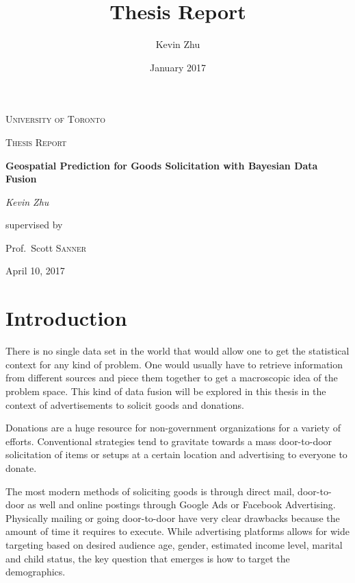 \documentclass[12pt]{article}
\title{Thesis Report}
\date{January 2017}
\author{Kevin Zhu}
\begin{document}
\begin{titlepage}
   \centering
   {\scshape\LARGE University of Toronto \par}
   \vspace{1cm}
   {\scshape\Large Thesis Report\par}
   \vspace{1.5cm}
   {\huge\bfseries Geospatial Prediction for Goods Solicitation with Bayesian Data Fusion\par}
   \vspace{2cm}
   {\Large\itshape Kevin Zhu\par}
   \vfill
   supervised by\par
   Prof.~Scott \textsc{Sanner}
   \vfill
   {\large April 10, 2017\par}
\end{titlepage}

\newpage
\tableofcontents




\newpage
\section{Introduction}

There is no single data set in the world that would allow one to get the statistical context for any kind of problem. One would usually have to retrieve information from different sources and piece them together to get a macroscopic idea of the problem space. This kind of data fusion will be explored in this thesis in the context of advertisements to solicit goods and donations. 

Donations are a huge resource for non-government organizations for a variety of efforts. %
Conventional strategies tend to gravitate towards a mass door-to-door solicitation of items or setups at a certain location and advertising to everyone to donate. %

The most modern methods of soliciting goods is through direct mail, door-to-door as well and online postings through Google Ads or Facebook Advertising. Physically mailing or going door-to-door have very clear drawbacks because the amount of time it requires to execute. While advertising platforms allows for wide targeting based on desired audience age, gender, estimated income level, marital and child status, the key question that emerges is how to target the demographics. 
\end{document}
